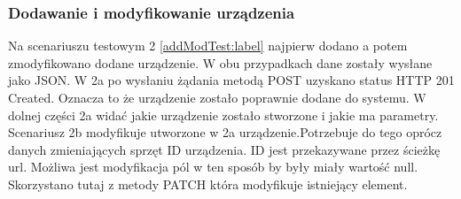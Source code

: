 \subsubsection{Dodawanie i modyfikowanie urządzenia}
Na scenariuszu testowym 2 \ref{addModTest:label} najpierw dodano a potem zmodyfikowano dodane urządzenie. W obu przypadkach dane zostały wysłane jako JSON. W 2a po wysłaniu żądania metodą POST uzyskano status HTTP 201 Created. Oznacza to że urządzenie zostało poprawnie dodane do systemu. W dolnej części 2a widać jakie urządzenie zostało stworzone i jakie ma parametry. Scenariusz 2b modyfikuje utworzone w 2a urządzenie.Potrzebuje do tego oprócz danych zmieniających sprzęt ID urządzenia. ID jest przekazywane przez ścieżkę url. Możliwa jest modyfikacja pól w ten sposób by były miały wartość null. Skorzystano tutaj z metody PATCH która modyfikuje istniejący element.

